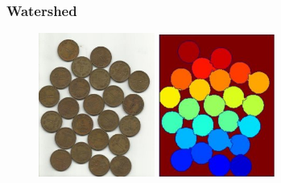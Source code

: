 \documentclass[notheorems,mathserif,table,compress]{beamer}  %
\begin{document}
\begin{frame}
  \frametitle{Watershed}
  \begin{figure}[!ht]
  \begin{minipage}[t]{0.4\textwidth}
  \centering
  \includegraphics[width=1.5in]{watershed1.png}
  \end{minipage}
  \begin{minipage}[t]{0.4\textwidth}
  \centering
  \includegraphics[width=1.5in]{watershed3.png}
  \end{minipage} 
  \end{figure}  
\end{frame}
\end{document}
